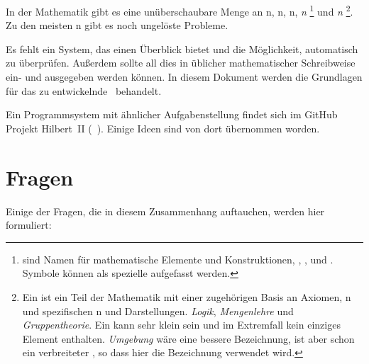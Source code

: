 In der Mathematik gibt es eine unüberschaubare Menge an n, n, n, \emph{n}%
\footnote{%
	\emph{} sind Namen für mathematische Elemente und Konstruktionen, \textzB {}, ,   und .
	Symbole können als spezielle  aufgefasst werden.%
}
und \emph{n}%
\footnote{%
	Ein \emph{} ist ein Teil der Mathematik mit einer zugehörigen Basis an Axiomen, n und spezifischen n und Darstellungen.
	\textZB \emph{Logik}, \emph{Mengenlehre} und \emph{Gruppentheorie}.
	Ein  kann sehr klein sein und im Extremfall kein einziges Element enthalten.
	\emph{Umgebung} wäre eine bessere Bezeichnung, ist aber schon ein verbreiteter , so dass hier die Bezeichnung  verwendet wird.%
}.
Zu den meisten n gibt es noch ungelöste Probleme.

Es fehlt ein System, das einen Überblick bietet und die Möglichkeit,  automatisch zu überprüfen.
Außerdem sollte all dies in üblicher mathematischer Schreibweise ein- und ausgegeben werden können.
In diesem Dokument werden die Grundlagen für das zu entwickelnde \ASBA\ behandelt.

Ein Programmsystem mit ähnlicher Aufgabenstellung findet sich im GitHub Projekt Hilbert~II (\seename~\cite{bib:HilbertII, bib:qedeq}).
Einige Ideen sind von dort übernommen worden.

\section{Fragen}%
\label{sec:Fragen}

Einige der Fragen, die in diesem Zusammenhang auftauchen,
werden hier formuliert:

